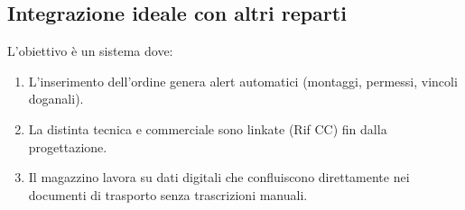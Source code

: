 \documentclass[12pt, a4paper]{article} %
\begin{document}
\subsection{Integrazione ideale con altri reparti}
L'obiettivo è un sistema dove:
\begin{enumerate}
    \item L'inserimento dell'ordine genera alert automatici (montaggi, permessi, vincoli
          doganali).
    \item La distinta tecnica e commerciale sono linkate (Rif CC) fin dalla
          progettazione.
    \item Il magazzino lavora su dati digitali che confluiscono direttamente nei
          documenti di trasporto senza trascrizioni manuali.
\end{enumerate}
\end{document}
